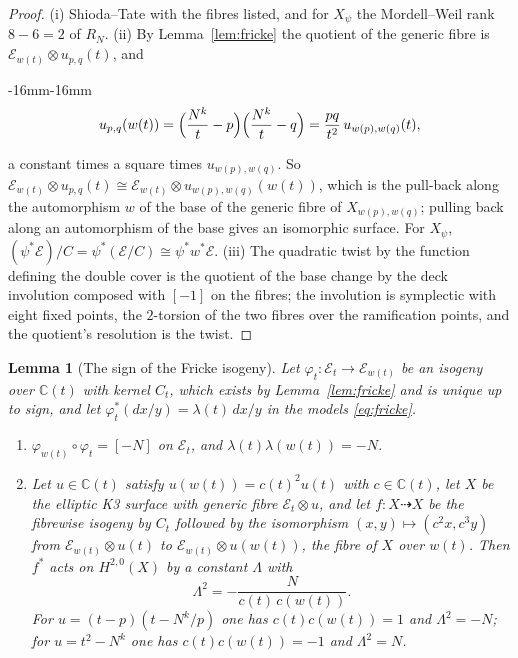 \documentclass[11pt,reqno]{amsart}
\newenvironment{widetext}{\begin{adjustwidth}{-16mm}{-16mm}}{\end{adjustwidth}}
\numberwithin{equation}{section}
\theoremstyle{plain}
\newtheorem{lemma}[theorem]{Lemma}
\theoremstyle{definition}
\newcommand{\CC}{\mathbb{C}}
\begin{document}
\begin{proof}
(i) Shioda--Tate with the fibres listed, and for $X_{\psi}$ the Mordell--Weil rank $8-6=2$ of $R_{N}$. (ii) By Lemma~\ref{lem:fricke} the quotient of the generic fibre is $\mathcal{E}_{w(t)}\otimes u_{p,q}(t)$, and
\begin{widetext}
\begin{equation}\label{eq:frickeu}
u_{p,q}(w(t))=\Bigl(\frac{N^{k}}{t}-p\Bigr)\Bigl(\frac{N^{k}}{t}-q\Bigr)=\frac{pq}{t^{2}}\,u_{w(p),w(q)}(t),
\end{equation}
\end{widetext}
a constant times a square times $u_{w(p),w(q)}$. So $\mathcal{E}_{w(t)}\otimes u_{p,q}(t)\cong\mathcal{E}_{w(t)}\otimes u_{w(p),w(q)}(w(t))$, which is the pull-back along the automorphism $w$ of the base of the generic fibre of $X_{w(p),w(q)}$; pulling back along an automorphism of the base gives an isomorphic surface. For $X_{\psi}$, $(\psi^{*}\mathcal{E})/C=\psi^{*}(\mathcal{E}/C)\cong\psi^{*}w^{*}\mathcal{E}$. (iii) The quadratic twist by the function defining the double cover is the quotient of the base change by the deck involution composed with $[-1]$ on the fibres; the involution is symplectic with eight fixed points, the $2$-torsion of the two fibres over the ramification points, and the quotient's resolution is the twist.
\end{proof}

\begin{lemma}[The sign of the Fricke isogeny]\label{lem:frickesign}
Let $\varphi_{t}\colon\mathcal{E}_{t}\to\mathcal{E}_{w(t)}$ be an isogeny over $\CC(t)$ with kernel $C_{t}$, which exists by Lemma~\ref{lem:fricke} and is unique up to sign, and let $\varphi_{t}^{*}(dx/y)=\lambda(t)\,dx/y$ in the models \eqref{eq:fricke}.
\begin{enumerate}[label=\textup{(\roman*)},leftmargin=2.4em,itemsep=2pt]
\item $\varphi_{w(t)}\circ\varphi_{t}=[-N]$ on $\mathcal{E}_{t}$, and $\lambda(t)\lambda(w(t))=-N$.
\item Let $u\in\CC(t)$ satisfy $u(w(t))=c(t)^{2}u(t)$ with $c\in\CC(t)$, let $X$ be the elliptic K3 surface with generic fibre $\mathcal{E}_{t}\otimes u$, and let $f\colon X\dashrightarrow X$ be the fibrewise isogeny by $C_{t}$ followed by the isomorphism $(x,y)\mapsto(c^{2}x,c^{3}y)$ from $\mathcal{E}_{w(t)}\otimes u(t)$ to $\mathcal{E}_{w(t)}\otimes u(w(t))$, the fibre of $X$ over $w(t)$. Then $f^{*}$ acts on $H^{2,0}(X)$ by a constant $\Lambda$ with
\[
\Lambda^{2}=-\frac{N}{c(t)\,c(w(t))}.
\]
For $u=(t-p)(t-N^{k}/p)$ one has $c(t)c(w(t))=1$ and $\Lambda^{2}=-N$; for $u=t^{2}-N^{k}$ one has $c(t)c(w(t))=-1$ and $\Lambda^{2}=N$.
\end{enumerate}
\end{lemma}
\end{document}
